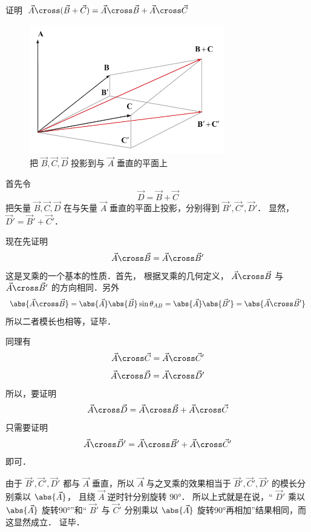 
证明 $\vec A \cross (\vec B + \vec C) = \vec A \cross \vec B + \vec A \cross \vec C$ 

\begin{figure}[ht]
\vskip-10pt
\centering
\includegraphics[width=8.5cm]{./figures/CrossP1.pdf}
\caption{把 $\vec B,\vec C,\vec D$ 投影到与 $\vec A$ 垂直的平面上}
\end{figure}

首先令
\begin{equation}
\vec D = \vec B + \vec C
\end{equation}
把矢量 $\vec B,\vec C,\vec D$ 在与矢量 $\vec A$ 垂直的平面上投影，分别得到 $\vec B',\vec C',\vec D'$． 显然，$\vec D'=\vec B'+\vec C'$． 

现在先证明
\begin{equation}
\vec A \cross \vec B = \vec A \cross \vec B'
\end{equation} 
这是叉乘的一个基本的性质．首先，
根据叉乘的几何定义， $\vec A \cross \vec B$ 与
 $\vec A \cross \vec B'$ 的方向相同．另外
\begin{equation}
\abs{\vec A \cross \vec B}  = \abs{\vec A} \abs{\vec B} \sin{\theta_{AB}} = \abs{\vec A} \abs{\vec B'}=\abs{\vec A \cross \vec B'}
\end{equation}
所以二者模长也相等，证毕．

同理有 
\begin{equation}
\vec A \cross \vec C = \vec A \cross \vec C'
\end{equation}
\begin{equation}
\vec A \cross \vec D = \vec A \cross \vec D'
\end{equation}
所以，要证明
\begin{equation}
\vec A \cross \vec D = \vec A \cross \vec B + \vec A \cross \vec C
\end{equation}
只需要证明
\begin{equation}
\vec A \cross \vec D' = \vec A \cross \vec B' + \vec A \cross \vec C'
\end{equation}
即可．

由于 $\vec B', \vec C', \vec D'$ 都与 $\vec A$ 垂直，所以 $\vec A$ 与之叉乘的效果相当于 $\vec B', \vec C', \vec D'$ 的模长分别乘以 $\abs {\vec A}$， 且绕 $\vec A$ 逆时针分别旋转 $90°$． 所以上式就是在说，“ $\vec D'$ 乘以 $\abs{\vec A} $ 旋转90°”和“ $\vec B'$ 与 $\vec C'$ 分别乘以 $\abs{\vec A}$ 旋转90°再相加”结果相同，而这显然成立． 证毕．




















